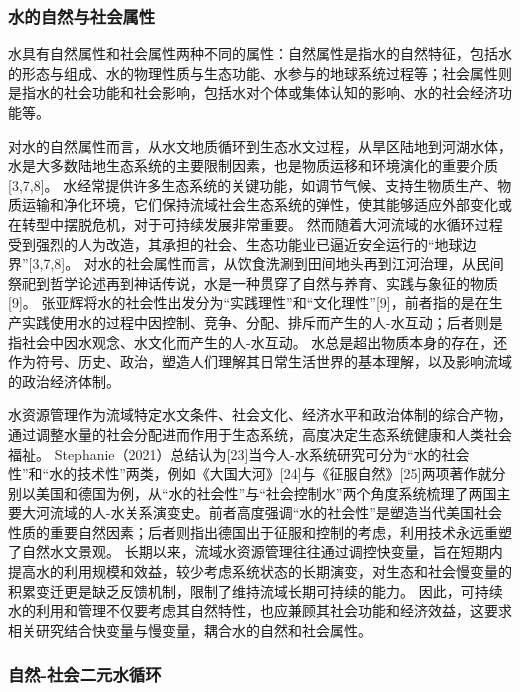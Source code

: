 

\subsubsection*{水的自然与社会属性}

水具有自然属性和社会属性两种不同的属性\cite{ning2004}：自然属性是指水的自然特征，包括水的形态与组成、水的物理性质与生态功能、水参与的地球系统过程等；社会属性则是指水的社会功能和社会影响，包括水对个体或集体认知的影响、水的社会经济功能等。

对水的自然属性而言，从水文地质循环到生态水文过程，从旱区陆地到河湖水体，水是大多数陆地生态系统的主要限制因素，也是物质运移和环境演化的重要介质[3,7,8]。
水经常提供许多生态系统的关键功能，如调节气候、支持生物质生产、物质运输和净化环境，它们保持流域社会生态系统的弹性，使其能够适应外部变化或在转型中摆脱危机，对于可持续发展非常重要。
然而随着大河流域的水循环过程受到强烈的人为改造，其承担的社会、生态功能业已逼近安全运行的“地球边界”[3,7,8]。
对水的社会属性而言，从饮食洗涮到田间地头再到江河治理，从民间祭祀到哲学论述再到神话传说，水是一种贯穿了自然与养育、实践与象征的物质[9]。
张亚辉将水的社会性出发分为“实践理性”和“文化理性”[9]，前者指的是在生产实践使用水的过程中因控制、竞争、分配、排斥而产生的人-水互动；后者则是指社会中因水观念、水文化而产生的人-水互动。
水总是超出物质本身的存在，还作为符号、历史、政治，塑造人们理解其日常生活世界的基本理解，以及影响流域的政治经济体制\cite{ballestero2019}。

水资源管理作为流域特定水文条件、社会文化、经济水平和政治体制的综合产物，通过调整水量的社会分配进而作用于生态系统，高度决定生态系统健康和人类社会福祉。
Stephanie（2021）总结认为[23]当今人-水系统研究可分为“水的社会性”和“水的技术性”两类，例如《大国大河》[24]与《征服自然》[25]两项著作就分别以美国和德国为例，从“水的社会性”与“社会控制水”两个角度系统梳理了两国主要大河流域的人-水关系演变史。前者高度强调“水的社会性”是塑造当代美国社会性质的重要自然因素；后者则指出德国出于征服和控制的考虑，利用技术永远重塑了自然水文景观。
长期以来，流域水资源管理往往通过调控快变量，旨在短期内提高水的利用规模和效益，较少考虑系统状态的长期演变，对生态和社会慢变量的积累变迁更是缺乏反馈机制，限制了维持流域长期可持续的能力。
因此，可持续水的利用和管理不仅要考虑其自然特性，也应兼顾其社会功能和经济效益，这要求相关研究结合快变量与慢变量，耦合水的自然和社会属性。

\subsubsection*{自然-社会二元水循环}

